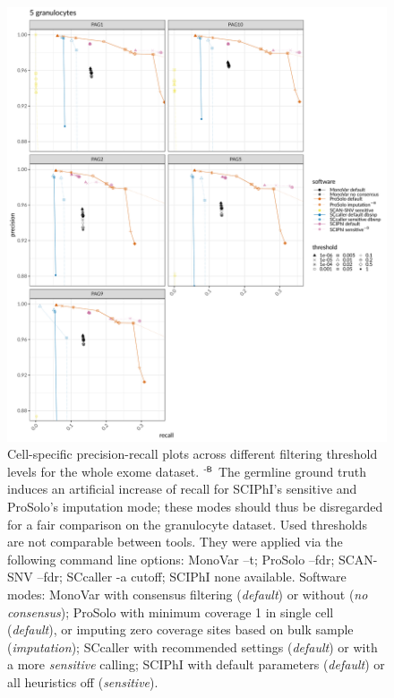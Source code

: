 \documentclass[authoryear,preprint,11pt]{scrartcl}
\begin{document}
\begin{figure}[!tpb]
  \includegraphics[width=\linewidth]{figs/Laehnemann2017/Laehnemann2017_prosolo-monovar-scansnv-sccaller-sciphi_per-cell_prec-rec.pdf}
 \caption{
 Cell-specific precision-recall plots across different filtering threshold levels for the whole exome dataset.\newline \footnotesize
  $^\text{\sffamily-B}$ The germline ground truth induces an artificial increase of recall for SCIPhI's sensitive and ProSolo's imputation mode; these modes should thus be disregarded for a fair comparison on the granulocyte dataset.\newline
  Used thresholds are not comparable between tools.
  They were applied via the following command line options:
  MonoVar {\ttfamily --t};
  ProSolo {\ttfamily --fdr};
  SCAN-SNV {\ttfamily --fdr};
  SCcaller {\ttfamily -a cutoff};
  SCIPhI {\ttfamily none available}.
  Software modes:
  MonoVar with consensus filtering ({\itshape default}) or without ({\itshape no consensus});
  ProSolo with minimum coverage 1 in single cell ({\itshape default}), or imputing zero coverage sites based on bulk sample ({\itshape imputation});
  SCcaller with recommended settings ({\itshape default}) or with a more {\itshape sensitive} calling;
  SCIPhI with default parameters ({\itshape default}) or all heuristics off ({\itshape sensitive}).
 }
 \label{fig:per-cell_prec-rec_Laehnemann2017}
\end{figure}
\end{document}
